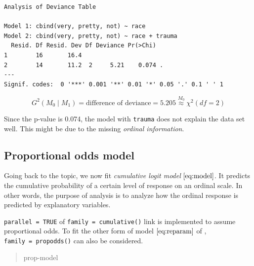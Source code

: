 \documentclass[]{book}
\newenvironment{Shaded}{\begin{snugshade}}{\end{snugshade}}
\newcommand{\DataTypeTok}[1]{\textcolor[rgb]{0.13,0.29,0.53}{#1}}
\newcommand{\KeywordTok}[1]{\textcolor[rgb]{0.13,0.29,0.53}{\textbf{#1}}}
\newcommand{\NormalTok}[1]{#1}
\newcommand{\OperatorTok}[1]{\textcolor[rgb]{0.81,0.36,0.00}{\textbf{#1}}}
\newcommand{\OtherTok}[1]{\textcolor[rgb]{0.56,0.35,0.01}{#1}}
\newcommand{\StringTok}[1]{\textcolor[rgb]{0.31,0.60,0.02}{#1}}
\begin{document}
\begin{verbatim}
Analysis of Deviance Table

Model 1: cbind(very, pretty, not) ~ race
Model 2: cbind(very, pretty, not) ~ race + trauma
  Resid. Df Resid. Dev Df Deviance Pr(>Chi)  
1        16       16.4                       
2        14       11.2  2     5.21    0.074 .
---
Signif. codes:  0 '***' 0.001 '**' 0.01 '*' 0.05 '.' 0.1 ' ' 1
\end{verbatim}

\[G^2(M_0 \mid M_1) = \text{difference of deviance} = 5.205 \stackrel{M_0}{\approx} \chi^2(df = 2)\]

Since the p-value is 0.074, the model with \texttt{trauma} does not explain the data set well. This might be due to the missing \emph{ordinal information}.

\hypertarget{proportional-odds-model}{%
\subsection{Proportional odds model}\label{proportional-odds-model}}

Going back to the topic, we now fit \emph{cumulative logit model} \(\eqref{eq:model}\). It predicts the cumulative probability of a certain level of response on an ordinal scale. In other words, the purpose of analysis is to analyze how the ordinal response is predicted by explanatory variables.

\texttt{parallel\ =\ TRUE} of \texttt{family\ =\ cumulative()} link is implemented to assume proportional odds. To fit the other form of model \(\eqref{eq:reparam}\) of \citet{McCullagh:1989aa}, \texttt{family\ =\ propodds()} can also be considered.

\begin{quote}
prop-model
\end{quote}

\begin{Shaded}
\end{Shaded}
\end{document}
